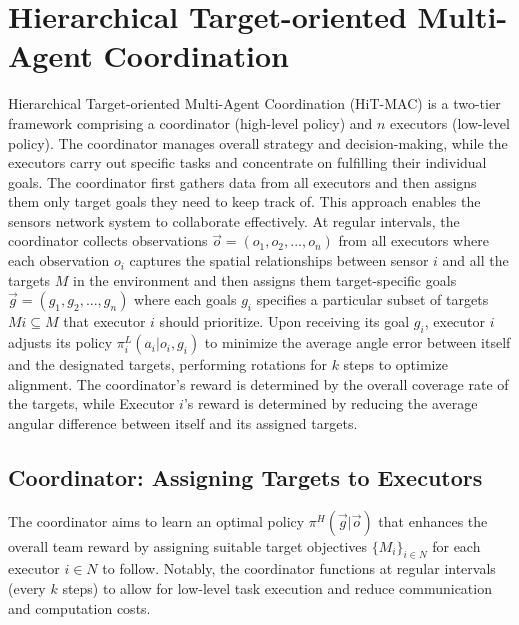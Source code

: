 \documentclass[preprint,12pt]{elsarticle}
\begin{document}

\section{Hierarchical Target-oriented Multi-Agent Coordination}
\label{sec:formulate}
Hierarchical Target-oriented Multi-Agent Coordination (HiT-MAC) is a two-tier framework comprising a coordinator (high-level policy) and $n$ executors (low-level policy). The coordinator manages overall strategy and decision-making, while the executors carry out specific tasks and concentrate on fulfilling their individual goals. The coordinator first gathers data from all executors and then assigns them only target goals they need to keep track of. This approach enables the sensors network system to collaborate effectively.
At regular intervals, the coordinator collects observations $\overset{\rightarrow}{o} = (o_1, o_2, ..., o_n)$ from all executors where each observation $o_i$ captures the spatial relationships between sensor $i$ and all the targets $M$ in the environment and then assigns them target-specific goals $\overset{\rightarrow}{g} = (g_1, g_2, ..., g_n)$ where each goals $g_i$ specifies a particular subset of targets $Mi \subseteq M$ that executor $i$ should prioritize. Upon receiving its goal $g_i$, executor $i$ adjusts its policy $\pi^{L}_i(a_i|o_i, g_i)$ to minimize the average angle error between itself and the designated targets, performing rotations for $k$ steps to optimize alignment. 
The coordinator's reward is determined by the overall coverage rate of the targets, while Executor $i$'s reward is determined by reducing the average angular difference between itself and its assigned targets.
\subsection{Coordinator: Assigning Targets to Executors}
The coordinator aims to learn an optimal policy $\pi^H(\overset{\rightarrow}{g}| \overset{\rightarrow}{o})$  that enhances the overall team reward by assigning suitable target objectives $\{M_i\}_{i\in N}$ for each executor $i\in N$ to follow. Notably, the coordinator functions at regular intervals (every $k$ steps) to allow for low-level task execution and reduce communication and computation costs.
\end{document}
